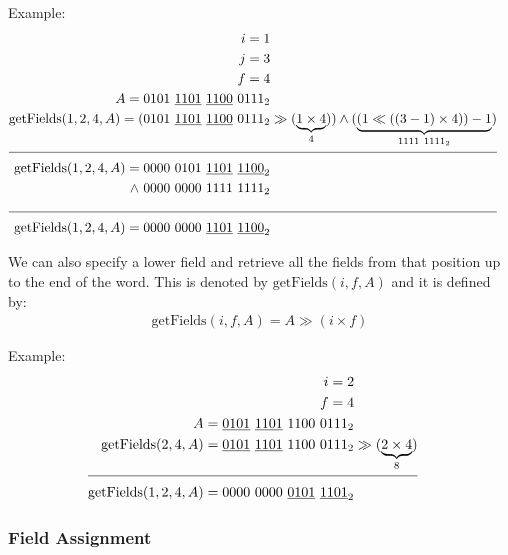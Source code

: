 Example:
\begin{align*}
    i = 1\\
    j = 3\\
    f = 4\\
    A = 0101\ \underline{1101}\ \underline{1100}\ 0111_2& \\
    \text{getFields}(1, 2, 4, A) = (0101\ \underline{1101}\ \underline{1100}\ 0111_2& \gg (\underbrace{1 \times 4}_{4})) \wedge (\underbrace{(1 \ll ((3 - 1) \times 4)) - 1}_{1111\ 1111_2})\\
    \cline{1-2}
    \text{getFields}(1, 2, 4, A) = 0000\ 0101\ \underline{1101}\ \underline{1100}_2&\\
    \wedge\ 0000\ 0000\ 1111\ 1111_2 \\
    \cline{1-2}
    \text{getFields}(1, 2, 4, A) = 0000\ 0000\ \underline{1101}\ \underline{1100}_2&
\end{align*}

We can also specify a lower field and retrieve all the fields from that position up to the end of the word. This is denoted by $\text{getFields}(i, f, A)$ and it is defined by:
\begin{align*}
    \text{getFields}(i, f, A) = A \gg (i \times f)
\end{align*}

Example:
\begin{align*}
    i = 2\\
    f = 4\\
    A = \underline{0101}\ \underline{1101}\ 1100\ 0111_2& \\
    \text{getFields}(2, 4, A) = \underline{0101}\ \underline{1101}\ 1100\ 0111_2& \gg (\underbrace{2 \times 4}_{8})\\
    \cline{1-2}
    \text{getFields}(1, 2, 4, A) = 0000\ 0000\ \underline{0101}\ \underline{1101}_2&
\end{align*}

\subsubsection{Field Assignment}

